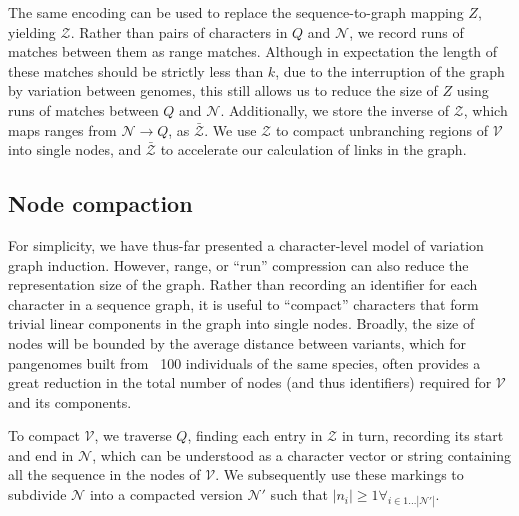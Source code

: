 \documentclass{bioinfo}
\theoremstyle{definition}
\begin{document}
The same encoding can be used to replace the sequence-to-graph mapping $Z$, yielding $\mathcal{Z}$.
Rather than pairs of characters in $Q$ and $\mathcal{N}$, we record runs of matches between them as range matches.
Although in expectation the length of these matches should be strictly less than $k$, due to the interruption of the graph by variation between genomes, this still allows us to reduce the size of $Z$ using runs of matches between $Q$ and $\mathcal{N}$.
Additionally, we store the inverse of $\mathcal{Z}$, which maps ranges from $\mathcal{N} \to Q$, as $\bar{\mathcal{Z}}$.
We use $\mathcal{Z}$ to compact unbranching regions of $\mathcal{V}$ into single nodes, and $\bar{\mathcal{Z}}$ to accelerate our calculation of links in the graph.




\subsection{Node compaction}

For simplicity, we have thus-far presented a character-level model of variation graph induction.
However, range, or ``run'' compression can also reduce the representation size of the graph.
Rather than recording an identifier for each character in a sequence graph, it is useful to ``compact'' characters that form trivial linear components in the graph into single nodes.
Broadly, the size of nodes will be bounded by the average distance between variants, which for pangenomes built from ~100 individuals of the same species, often provides a great reduction in the total number of nodes (and thus identifiers) required for $\mathcal{V}$ and its components.

To compact $\mathcal{V}$, we traverse $Q$, finding each entry in $\mathcal{Z}$ in turn, recording its start and end in $\mathcal{N}$, which can be understood as a character vector or string containing all the sequence in the nodes of $\mathcal{V}$.
We subsequently use these markings to subdivide $\mathcal{N}$ into a compacted version $\mathcal{N}'$ such that $|n_i| \ge 1 \forall_{i \in 1 \ldots |\mathcal{N}'|}$.
\end{document}
